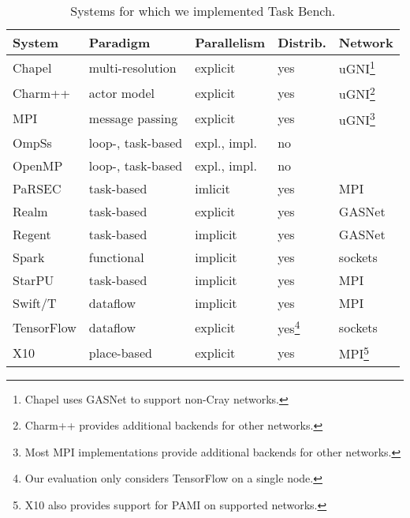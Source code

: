 \begin{table}[t]
\begin{tabular}{l | l | l | l | l}
System & Paradigm & Parallelism & Distrib. & Network \\
\hline
Chapel & multi-resolution & explicit & yes & uGNI\footnote{Chapel uses GASNet to support non-Cray networks.} \\
Charm++ & actor model & explicit & yes & uGNI\footnote{Charm++ provides additional backends for other networks.} \\
MPI & message passing & explicit & yes & uGNI\footnote{Most MPI implementations provide additional backends for other networks.} \\
OmpSs & loop-, task-based & expl., impl. & no & \\
OpenMP & loop-, task-based & expl., impl. & no & \\
PaRSEC & task-based & imlicit & yes & MPI \\
Realm & task-based & explicit & yes & GASNet \\
Regent & task-based & implicit & yes & GASNet \\
Spark & functional & implicit & yes & sockets \\
StarPU & task-based & implicit & yes & MPI \\
Swift/T & dataflow & implicit & yes & MPI \\
TensorFlow & dataflow & explicit & yes\footnote{Our evaluation only considers TensorFlow on a single node.} & sockets \\
X10 & place-based & explicit & yes & MPI\footnote{X10 also provides support for PAMI on supported networks.}
\end{tabular}

\caption{Systems for which we implemented Task Bench.\label{tab:systems}}
\vspace{-0.5cm}
\end{table}
